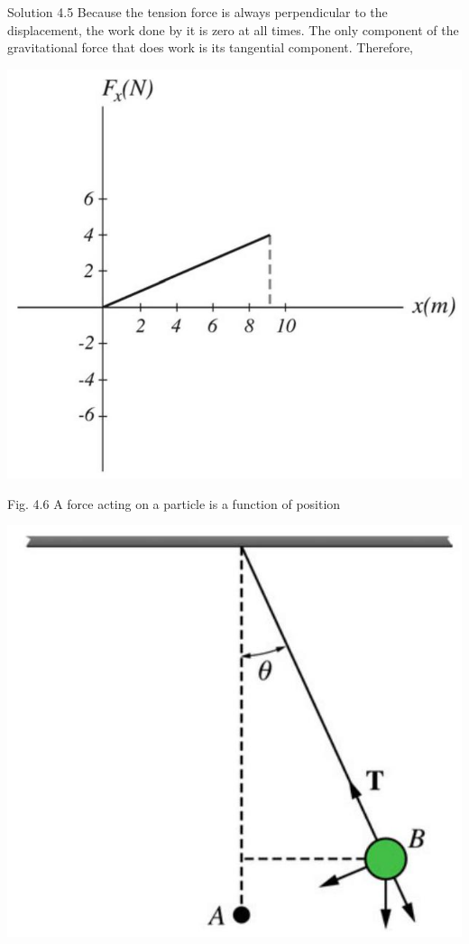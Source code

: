 \documentclass[10pt]{article}
\begin{document}
Solution 4.5 Because the tension force is always perpendicular to the displacement, the work done by it is zero at all times. The only component of the gravitational force that does work is its tangential component. Therefore,

\begin{center}
\includegraphics[max width=\textwidth]{2024_09_13_db1f357d2aad0a03eb2eg-065}
\end{center}

Fig. 4.6 A force acting on a particle is a function of position

\begin{center}
\includegraphics[max width=\textwidth]{2024_09_13_db1f357d2aad0a03eb2eg-065(1)}
\end{center}
\end{document}
